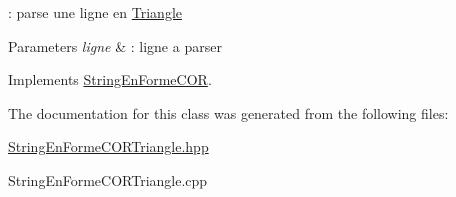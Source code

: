 \+: parse une ligne en \mbox{\hyperlink{class_triangle}{Triangle}} 


\begin{DoxyParams}{Parameters}
{\em ligne} & \+: ligne a parser \\
\hline
\end{DoxyParams}


Implements \mbox{\hyperlink{class_string_en_forme_c_o_r}{String\+En\+Forme\+C\+OR}}.



The documentation for this class was generated from the following files\+:\begin{DoxyCompactItemize}
\item 
\mbox{\hyperlink{_string_en_forme_c_o_r_triangle_8hpp}{String\+En\+Forme\+C\+O\+R\+Triangle.\+hpp}}\item 
String\+En\+Forme\+C\+O\+R\+Triangle.\+cpp\end{DoxyCompactItemize}
